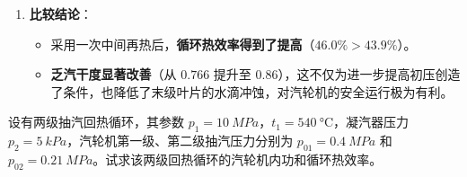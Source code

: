 \begin{solution}
\begin{enumerate}
\item \textbf{比较结论}：
\begin{itemize}
\item 采用一次中间再热后，\textbf{循环热效率得到了提高}（\(46.0\% > 43.9\%\)）。
\item \textbf{乏汽干度显著改善}（从 \(0.766\) 提升至 \(0.86\)），这不仅为进一步提高初压创造了条件，也降低了末级叶片的水滴冲蚀，对汽轮机的安全运行极为有利。
\end{itemize}
\end{enumerate}
\end{solution}

\begin{problem}
设有两级抽汽回热循环，其参数 \(p_1 = \qty{10}{MPa}\)，\(t_1 = \qty{540}{\degreeCelsius}\)，凝汽器压力 \(p_2 = \qty{5}{kPa}\)，汽轮机第一级、第二级抽汽压力分别为 \(p_{01} = \qty{0.4}{MPa}\) 和 \(p_{02} = \qty{0.21}{MPa}\)。试求该两级回热循环的汽轮机内功和循环热效率。
\end{problem}

